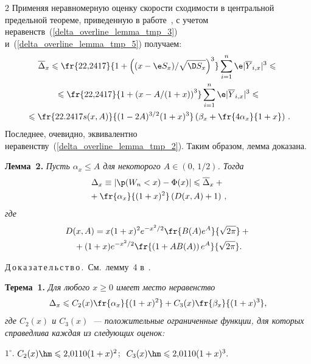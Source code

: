 \begin{multicols}{2}
Применяя неравномерную оценку скорости сходимости в центральной
предельной теореме, приведенную в работе~\cite{GP2011}, с учетом
неравенств~(\ref{delta_overline_lemma_tmp_3}) 
и~(\ref{delta_overline_lemma_tmp_5}) получаем:
\begin{multline*}
\overline{\Delta}_x\leqslant\fr{22{,}2417}{1+\left((x-\e
S_x)/\sqrt{\D S_x}\right)^3}\sum\limits_{i=1}^n\e
|\overline{Y}_{i,x}|^3\leqslant{}\\
{}\leqslant\fr{22{,}2417} {1+\left(x-{A}/(1+x)\right)^3}
\sum\limits_{i=1}^n\e
|\overline{Y}_{i,x}|^3\leqslant{}\\
{}\leqslant\fr{22.2417s(x,A)}{(1-2A)^{3/2}(1+x)^3}\left(\beta_x+\fr{4\alpha_x}{1+x}\right)\,.
\end{multline*}
Последнее, очевидно, эквивалентно неравенству~(\ref{delta_overline_lemma_tmp_2}). Таким образом, лемма доказана.

\medskip


\noindent
\textbf{Лемма~2.} %
\textit{Пусть $\alpha_x\leqslant A$ для
некоторого $A\in(0,\,1/2)$. Тогда}
\begin{multline*}
\Delta_x\equiv|\p(W_n<x)-\Phi(x)|\leqslant\overline\Delta_x+{}\\
{}+
\fr{\alpha_x}{(1+x)^2}\left(D(x,A)+1\right)\,,
\end{multline*}
\textit{где}
\begin{multline}
\label{D(x,A)}
D(x,A)=x(1+x)^2 e^{-x^2/2} \fr{B(A)e^A}{\sqrt{2\pi}}+ {}\\
{}+(1+x)
e^{-x^2/2} \fr{\left(1+AB(A)\right)e^A}{\sqrt{2\pi}}.
\end{multline}


\smallskip

\noindent
Д\,о\,к\,а\,з\,а\,т\,е\,л\,ь\,с\,т\,в\,о\,.\ См.~лемму~4 в~\cite{KP2011_Neam}.

\medskip

\noindent
\textbf{Терема~1.} \textit{%
Для любого $x\geqslant 0$ имеет место неравенство
$$
\Delta_x\leqslant
C_2(x)\fr{\alpha_x}{(1+x)^2}+C_3(x)\fr{\beta_x}{(1+x)^3},
$$
где $C_2(x)$ и $C_3(x)$~--- положительные ограниченные функции, для
которых справедлива каждая из следующих оценок:}

\pagebreak

\noindent\hspace*{2mm}$1^{\circ}$.
$
C_2(x)\hm\leqslant 2{,}0110(1+x)^2$;\ \,$C_3(x)\hm\leqslant 2{,}0110(1+x)^3.
$


\end{multicols}
